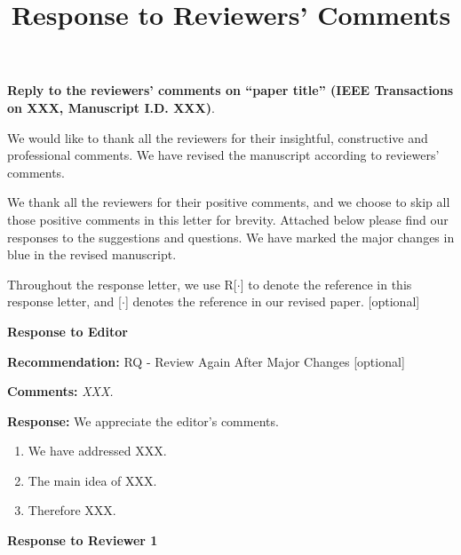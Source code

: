 \documentclass[12pt, onecolumn, final]{IEEEtran}
\theoremstyle{plain}\newtheorem{comment}{Comment}
\theoremstyle{definition}\newtheorem{response}{Response}
\begin{document}
\title{Response to Reviewers' Comments}
\author{}
\date{}

\maketitle

\textbf{Reply to the reviewers' comments on ``paper title'' (IEEE Transactions on XXX, Manuscript I.D. XXX)}.

We would like to thank all the reviewers for their insightful, constructive and professional comments. We have revised the manuscript according to reviewers' comments.

We thank all the reviewers for their positive comments, and we choose to skip all those positive comments in this letter for brevity. Attached below please find our responses to the suggestions and questions. We  have marked the major changes in blue in the revised manuscript.

Throughout the response letter, we use R[$\cdot$] to denote the reference in this response letter, and [$\cdot$] denotes the reference in our revised paper. [optional]

\begin{center}
\huge \textbf{Response to Editor}
\end{center}

\textbf{Recommendation:} RQ - Review Again After Major Changes [optional]

\textbf{Comments:}
\textit{XXX.}

    \textbf{Response:}
    We appreciate the editor's comments.
    \begin{enumerate}
        \item We have addressed XXX.
        \item The main idea of XXX.
        \item Therefore XXX.
    \end{enumerate}

\clearpage

\begin{center}
\huge \textbf{Response to Reviewer 1}
\end{center}
\end{document}
